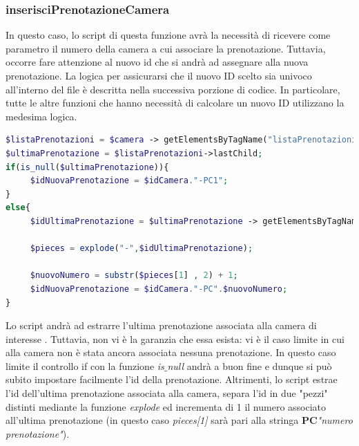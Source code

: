 \documentclass [a4paper, 12pt]{book}
\begin{document}
\subsubsection{inserisciPrenotazioneCamera}
In questo caso, lo script di questa funzione avrà la necessità di ricevere come parametro il numero della camera a cui associare la prenotazione. Tuttavia, occorre fare attenzione al nuovo id che si andrà ad assegnare alla nuova prenotazione. La logica per assicurarsi che il nuovo ID scelto sia univoco all'interno del file è descritta nella successiva porzione di codice. In particolare, tutte le altre funzioni che hanno necessità di calcolare un nuovo ID utilizzano la medesima logica.
\begin{lstlisting}[style=XML , language=PHP]
$listaPrenotazioni = $camera -> getElementsByTagName("listaPrenotazioni") -> item(0);
$ultimaPrenotazione = $listaPrenotazioni->lastChild;
if(is_null($ultimaPrenotazione)){
     $idNuovaPrenotazione = $idCamera."-PC1";
}
else{
     $idUltimaPrenotazione = $ultimaPrenotazione -> getElementsByTagName('idPrenotazione')->item(0)->textContent;

     $pieces = explode("-",$idUltimaPrenotazione);

     $nuovoNumero = substr($pieces[1] , 2) + 1;
     $idNuovaPrenotazione = $idCamera."-PC".$nuovoNumero;    
}
\end{lstlisting}
Lo script andrà ad estrarre l'ultima prenotazione associata alla camera di interesse . Tuttavia, non vi è la garanzia che essa esista: vi è il caso limite in cui alla camera non è stata ancora associata nessuna prenotazione. In questo caso limite il controllo if con la funzione \textit{is$\_$null} andrà a buon fine e dunque si può subito impostare facilmente l'id della prenotazione. Altrimenti, lo script estrae l'id dell'ultima prenotazione associata alla camera, separa l'id in due "pezzi" distinti mediante la funzione \textit{explode} ed incrementa di 1 il numero associato all'ultima prenotazione (in questo caso \textit{pieces[1]} sarà pari alla stringa \textbf{PC}\textit{"numero prenotazione"}).
\end{document}

